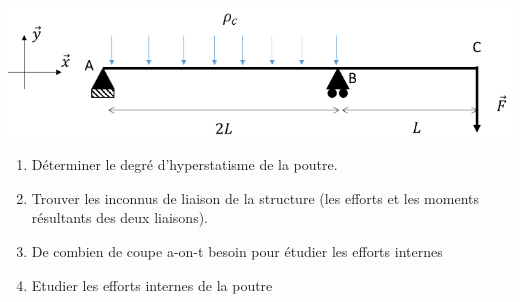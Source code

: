 \documentclass[lecture.tex]{subfiles}
\begin{document}
\exercice{}


\begin{center}
  \includegraphics[scale=0.5]{exo-poutre-en-appuie-chargee.png}
\end{center}

\begin{enumerate}
  \item Déterminer le degré d’hyperstatisme de la poutre.
  \item Trouver les inconnus de liaison de la structure (les efforts et les moments résultants des deux liaisons).
  \item De combien de coupe a-on-t besoin pour étudier les efforts internes
  \item Etudier les efforts internes de la poutre
\end{enumerate}

\finexercice
\end{document}
